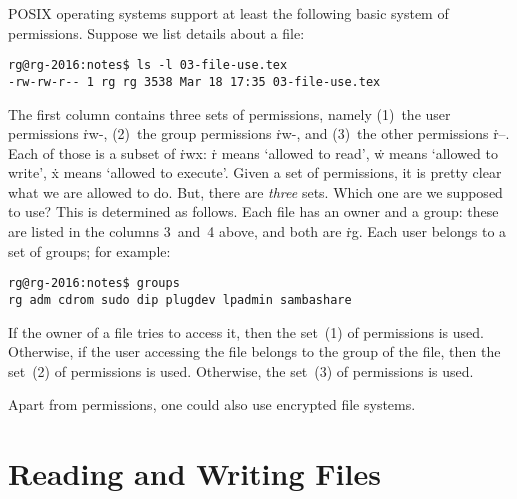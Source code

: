 POSIX operating systems support at least the following basic system of permissions.
Suppose we list details about a file:
\begin{verbatim}
rg@rg-2016:notes$ ls -l 03-file-use.tex
-rw-rw-r-- 1 rg rg 3538 Mar 18 17:35 03-file-use.tex
\end{verbatim}
The first column contains three sets of permissions, namely
  (1)~the user permissions \.{rw-},
  (2)~the group permissions \.{rw-}, and
  (3)~the other permissions \.{r--}.
Each of those is a subset of \.{rwx}:
  \.{r} means `allowed to read',
  \.{w} means `allowed to write',
  \.{x} means `allowed to execute'.
Given a set of permissions, it is pretty clear what we are allowed to do.
But, there are \emph{three} sets.
Which one are we supposed to use?
This is determined as follows.
Each file has an owner and a group:
  these are listed in the columns 3~and~4 above, and both are \.{rg}.
Each user belongs to a set of groups; for example:
\begin{verbatim}
rg@rg-2016:notes$ groups
rg adm cdrom sudo dip plugdev lpadmin sambashare
\end{verbatim}
If the owner of a file tries to access it,
  then the set~(1) of permissions is used.
Otherwise, if the user accessing the file belongs to the group of the file,
  then the set~(2) of permissions is used.
Otherwise, the set~(3) of permissions is used.

\smallskip

Apart from permissions, one could also use encrypted file systems.


\section{Reading and Writing Files}

